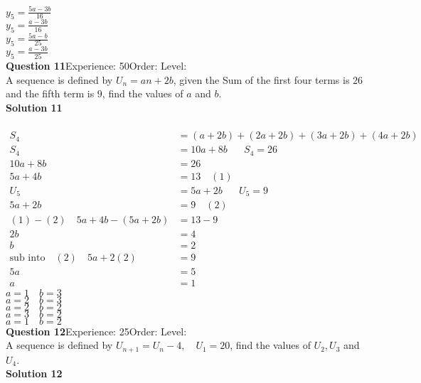 \documentclass{article}
\begin{document}
$y_5=\displaystyle\frac{5a-3b}{16}$\\
$y_5=\displaystyle\frac{a-3b}{16}$\\
$y_5=\displaystyle\frac{5a-b}{25}$\\
$y_5=\displaystyle\frac{a-3b}{25}$\\
\noindent\textbf{Question 11}\hspace{20pt}Experience: 50\hspace{20pt}Order: \hspace{20pt}Level: \\[2pt]
A sequence is defined by $U_n=an+2b$, given the Sum of the first four terms is $26$ and the fifth term is $9$, find the values of $a$ and $b$.\\[4pt]
\noindent\textbf{Solution 11}\\[2pt]
\\[-10pt]\begin{align*}
S_4&=(a+2b)+(2a+2b)+(3a+2b)+(4a+2b)\\[2pt]
S_4&=10a+8b\hspace{20pt} S_4=26\\[2pt]
10a+8b&=26\\[2pt]
5a+4b&=13\quad (1)\\[12pt]
U_5&=5a+2b\hspace{20pt}U_5=9\\[2pt]
5a+2b&=9\quad (2)\\[12pt]
(1)-(2)\quad 5a+4b-(5a+2b)&=13-9\\[2pt]
2b&=4\\[2pt]
b&=2\\[12pt]
\text{sub into}\quad (2) \quad 5a+2(2)&=9\\[2pt]
5a&=5\\[2pt]
a&=1
\end{align*}
$a=1\quad b=3$\\
$a=2 \quad b=3$\\
$a=2 \quad b=2$\\
$a=3 \quad b=2$\\
$a=1 \quad b=2$\\
\noindent\textbf{Question 12}\hspace{20pt}Experience: 25\hspace{20pt}Order: \hspace{20pt}Level: \\[2pt]
A sequence is defined by $U_{n+1}=U_n-4, \quad U_1=20$, find the values of $U_2,U_3$ and $U_4$.\\[4pt]
\noindent\textbf{Solution 12}\\[2pt]
\end{document}
